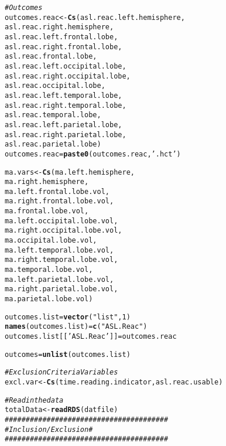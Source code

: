 \documentclass[10pt]{article}\usepackage[]{graphicx}\usepackage[]{color}
\makeatletter
\newcommand{\hlnum}[1]{\textcolor[rgb]{0.686,0.059,0.569}{#1}}%
\newcommand{\hlstr}[1]{\textcolor[rgb]{0.192,0.494,0.8}{#1}}%
\newcommand{\hlcom}[1]{\textcolor[rgb]{0.678,0.584,0.686}{\textit{#1}}}%
\newcommand{\hlstd}[1]{\textcolor[rgb]{0.345,0.345,0.345}{#1}}%
\newcommand{\hlkwb}[1]{\textcolor[rgb]{0.69,0.353,0.396}{#1}}%
\newcommand{\hlkwd}[1]{\textcolor[rgb]{0.737,0.353,0.396}{\textbf{#1}}}%
\newenvironment{kframe}{%
 \def\at@end@of@kframe{}%
 \ifinner\ifhmode%
  \def\at@end@of@kframe{\end{minipage}}%
  \begin{minipage}{\columnwidth}%
 \fi\fi%
 \def\FrameCommand##1{\hskip\@totalleftmargin \hskip-\fboxsep
 \colorbox{shadecolor}{##1}\hskip-\fboxsep
     \hskip-\linewidth \hskip-\@totalleftmargin \hskip\columnwidth}%
 \MakeFramed {\advance\hsize-\width
   \@totalleftmargin\z@ \linewidth\hsize
   \@setminipage}}%
 {\par\unskip\endMakeFramed%
 \at@end@of@kframe}
\newenvironment{knitrout}{}{} %
\makeatother
\begin{document}
\begin{knitrout}
\begin{kframe}
\begin{alltt}
\hlcom{#Outcomes}
\hlstd{outcomes.reac} \hlkwb{<-} \hlkwd{Cs}\hlstd{(asl.reac.left.hemisphere,}
                    \hlstd{asl.reac.right.hemisphere,}
                    \hlstd{asl.reac.left.frontal.lobe,}
                    \hlstd{asl.reac.right.frontal.lobe,}
                    \hlstd{asl.reac.frontal.lobe,}
                    \hlstd{asl.reac.left.occipital.lobe,}
                    \hlstd{asl.reac.right.occipital.lobe,}
                    \hlstd{asl.reac.occipital.lobe,}
                    \hlstd{asl.reac.left.temporal.lobe,}
                    \hlstd{asl.reac.right.temporal.lobe,}
                    \hlstd{asl.reac.temporal.lobe,}
                    \hlstd{asl.reac.left.parietal.lobe,}
                    \hlstd{asl.reac.right.parietal.lobe,}
                    \hlstd{asl.reac.parietal.lobe)}
\hlstd{outcomes.reac}\hlkwb{=}\hlkwd{paste0}\hlstd{(outcomes.reac,} \hlstr{'.hct'}\hlstd{)}

\hlstd{ma.vars} \hlkwb{<-} \hlkwd{Cs}\hlstd{(     ma.left.hemisphere,}
                   \hlstd{ma.right.hemisphere,}
                   \hlstd{ma.left.frontal.lobe.vol,}
                   \hlstd{ma.right.frontal.lobe.vol,}
                   \hlstd{ma.frontal.lobe.vol,}
                   \hlstd{ma.left.occipital.lobe.vol,}
                   \hlstd{ma.right.occipital.lobe.vol,}
                   \hlstd{ma.occipital.lobe.vol,}
                   \hlstd{ma.left.temporal.lobe.vol,}
                   \hlstd{ma.right.temporal.lobe.vol,}
                   \hlstd{ma.temporal.lobe.vol,}
                   \hlstd{ma.left.parietal.lobe.vol,}
                   \hlstd{ma.right.parietal.lobe.vol,}
                   \hlstd{ma.parietal.lobe.vol)}

\hlstd{outcomes.list}\hlkwb{=}\hlkwd{vector}\hlstd{(}\hlstr{"list"}\hlstd{,} \hlnum{1}\hlstd{)}
\hlkwd{names}\hlstd{(outcomes.list)}\hlkwb{=}\hlkwd{c}\hlstd{(}\hlstr{"ASL.Reac"}\hlstd{)}
\hlstd{outcomes.list[[}\hlstr{'ASL.Reac'}\hlstd{]]}\hlkwb{=}\hlstd{outcomes.reac}

\hlstd{outcomes}\hlkwb{=}\hlkwd{unlist}\hlstd{(outcomes.list)}

\hlcom{# Exclusion Criteria Variables}
\hlstd{excl.var} \hlkwb{<-} \hlkwd{Cs}\hlstd{(time.reading.indicator, asl.reac.usable)}

\hlcom{#Read in the data}
\hlstd{totalData} \hlkwb{<-} \hlkwd{readRDS}\hlstd{(datfile)}
\hlcom{#######################################}
\hlcom{#  Inclusion/Exclusion                #}
\hlcom{#######################################}


\end{alltt}
\end{kframe}
\end{knitrout}
\end{document}

